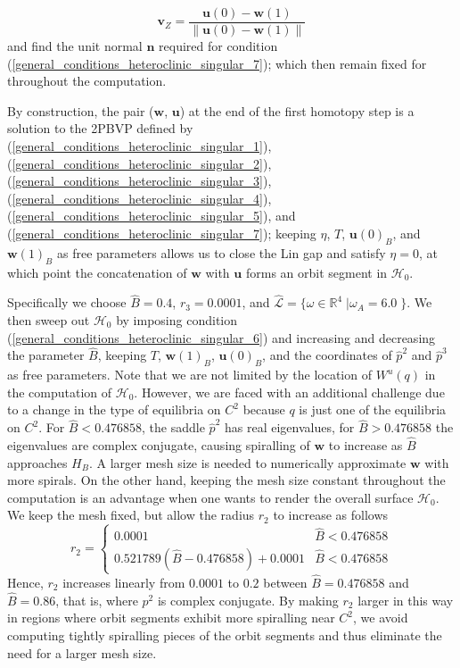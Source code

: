 \documentclass{ws-ijbc}
\begin{document}
	\begin{equation*}
		\mathbf{v}_Z = \frac{\mathbf{u}(0) - \mathbf{w}(1)}{\left\lVert \mathbf{u}(0) - \mathbf{w}(1) \right\lVert}
		\label{Lin_vector_singular}
	\end{equation*}
and find the unit normal $\mathbf{n}$ required for condition (\ref{general_conditions_heteroclinic_singular_7}); which then remain fixed for throughout the computation.

By construction, the pair ($\mathbf{w}$, $\mathbf{u}$) at the end of the first homotopy step is a solution to the 2PBVP defined by (\ref{general_conditions_heteroclinic_singular_1}), (\ref{general_conditions_heteroclinic_singular_2}), (\ref{general_conditions_heteroclinic_singular_3}), (\ref{general_conditions_heteroclinic_singular_4}), (\ref{general_conditions_heteroclinic_singular_5}), and (\ref{general_conditions_heteroclinic_singular_7}); keeping $\eta$, $T$, $\mathbf{u}(0)_B$, and $\mathbf{w}(1)_B$ as free parameters allows us to close the Lin gap and satisfy $\eta = 0$, at which point the concatenation of $\mathbf{w}$ with $\mathbf{u}$ forms an orbit segment in $\mathscr{H}_0$.

Specifically we choose $\widehat{B}=0.4$, $r_3 = 0.0001$, and $\widehat{\mathscr{L}}=\{ \omega \in \mathbb{R}^4 \; | \omega_A = 6.0\; \}$.  We then sweep out $\mathscr{H}_0$ by imposing condition (\ref{general_conditions_heteroclinic_singular_6}) and increasing and decreasing the parameter $\widehat{B}$, keeping $T$, $\mathbf{w}(1)_B$, $\mathbf{u}(0)_B$, and the coordinates of $\widehat{p}^2$ and $\widehat{p}^3$ as free parameters.  Note that we are not limited by the location of $W^u(q)$ in the computation of $\mathscr{H}_0$.  However, we are faced with an additional challenge due to a change in the type of equilibria on $C^2$ because $q$ is just one of the equilibria on $C^2$.  For $\widehat{B} < 0.476858$, the saddle $\widehat{p}^2$ has real eigenvalues, for $\widehat{B} > 0.476858$ the eigenvalues are complex conjugate, causing spiralling of $\mathbf{w}$ to increase as $\widehat{B}$ approaches $H_B$.  A larger mesh size is needed to numerically approximate $\mathbf{w}$ with more spirals.  On the other hand, keeping the mesh size constant throughout the computation is an advantage when one wants to render the overall surface $\mathscr{H}_0$.  We keep the mesh fixed, but allow the radius $r_2$ to increase as follows
\[r_2= \begin{cases} 
      0.0001 & \widehat {B} < 0.476858 \\
      0.521789(\widehat{B} - 0.476858) + 0.0001 & \widehat {B} < 0.476858
   \end{cases}
\]
Hence, $r_2$ increases linearly from $0.0001$ to $0.2$ between $\widehat{B}=0.476858$ and $\widehat{B}=0.86$, that is, where $p^2$ is complex conjugate. By making $r_2$ larger in this way in regions where orbit segments exhibit more spiralling near $C^2$, we avoid computing tightly spiralling pieces of the orbit segments and thus eliminate the need for a larger mesh size.
\end{document}
